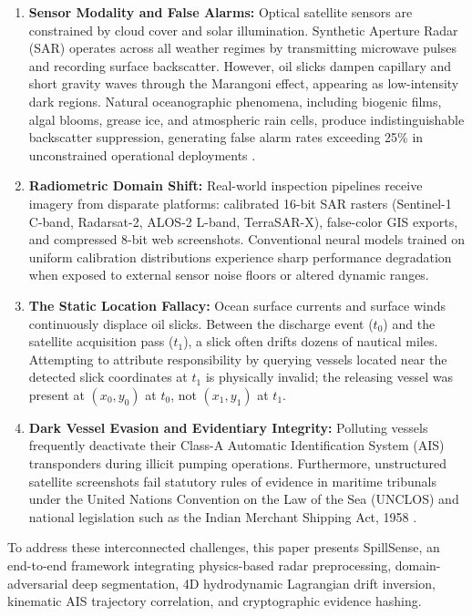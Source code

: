 \documentclass[conference]{IEEEtran}
\begin{document}
\begin{enumerate}
    \item \textbf{Sensor Modality and False Alarms:} Optical satellite sensors are constrained by cloud cover and solar illumination. Synthetic Aperture Radar (SAR) operates across all weather regimes by transmitting microwave pulses and recording surface backscatter. However, oil slicks dampen capillary and short gravity waves through the Marangoni effect, appearing as low-intensity dark regions. Natural oceanographic phenomena, including biogenic films, algal blooms, grease ice, and atmospheric rain cells, produce indistinguishable backscatter suppression, generating false alarm rates exceeding 25\% in unconstrained operational deployments \cite{topouzelis2008oil, brekke2005oil}.
    \item \textbf{Radiometric Domain Shift:} Real-world inspection pipelines receive imagery from disparate platforms: calibrated 16-bit SAR rasters (Sentinel-1 C-band, Radarsat-2, ALOS-2 L-band, TerraSAR-X), false-color GIS exports, and compressed 8-bit web screenshots. Conventional neural models trained on uniform calibration distributions experience sharp performance degradation when exposed to external sensor noise floors or altered dynamic ranges.
    \item \textbf{The Static Location Fallacy:} Ocean surface currents and surface winds continuously displace oil slicks. Between the discharge event ($t_0$) and the satellite acquisition pass ($t_1$), a slick often drifts dozens of nautical miles. Attempting to attribute responsibility by querying vessels located near the detected slick coordinates at $t_1$ is physically invalid; the releasing vessel was present at $(x_0, y_0)$ at $t_0$, not $(x_1, y_1)$ at $t_1$.
    \item \textbf{Dark Vessel Evasion and Evidentiary Integrity:} Polluting vessels frequently deactivate their Class-A Automatic Identification System (AIS) transponders during illicit pumping operations. Furthermore, unstructured satellite screenshots fail statutory rules of evidence in maritime tribunals under the United Nations Convention on the Law of the Sea (UNCLOS) \cite{unclos1982} and national legislation such as the Indian Merchant Shipping Act, 1958 \cite{indiamerchantshipping1958}.
\end{enumerate}

To address these interconnected challenges, this paper presents SpillSense, an end-to-end framework integrating physics-based radar preprocessing, domain-adversarial deep segmentation, 4D hydrodynamic Lagrangian drift inversion, kinematic AIS trajectory correlation, and cryptographic evidence hashing.
\end{document}
